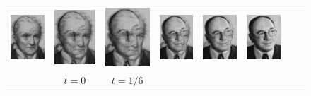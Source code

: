 \begin{figure}[!ht]
\begin{center}
\begin{tabular}{cccccccc}
\hspace{-0.35cm}\includegraphics[width=1.9cm]{images/MK/MK_beta1_11}&
\hspace{-0.35cm}\includegraphics[width=1.9cm]{images/MK/MK_beta1_21}&
\hspace{-0.35cm}\includegraphics[width=1.9cm]{images/MK/MK_beta1_31}&
\hspace{-0.35cm}\includegraphics[width=1.9cm]{images/MK/MK_beta1_41}&
\hspace{-0.35cm}\includegraphics[width=1.9cm]{images/MK/MK_beta1_51}&
\hspace{-0.35cm}\includegraphics[width=1.9cm]{images/MK/MK_beta1_61}\\
&\hspace{-0.45cm}$t=0$&\hspace{-0.45cm}$t=1/6$&

\end{tabular}
\end{center}
\end{figure}
